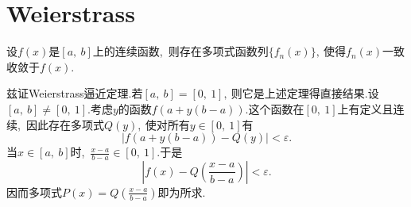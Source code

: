 \section{Weierstrass}
\begin{theorem}
	设$f(x)$是$[a,\ b]$上的连续函数,\ 则存在多项式函数列$\{f_n(x)\},\ $使得$f_n(x)$一致收敛于$f(x).$
\end{theorem}
兹证Weierstrass逼近定理.若$\left[a,\ b\right]=\left[0,\ 1\right],\ $则它是上述定理得直接结果.设$\left[a,\ b\right]\neq\left[0,\ 1\right].$考虑$y$的函数$f(a+y(b-a)).$这个函数在$\left[0,\ 1\right]$上有定义且连续,\ 因此存在多项式$Q(y),\ $使对所有$y\in\left[0,\ 1\right]$有
$$\left|f(a+y(b-a))-Q(y)\right|<\varepsilon.$$
当$x\in\left[a,\ b\right]$时,\ $\frac{x-a}{b-a}\in\left[0,\ 1\right].$于是
$$\left|f(x)-Q(\frac{x-a}{b-a})\right|<\varepsilon.$$
因而多项式$P(x)=Q(\frac{x-a}{b-a})$即为所求.
